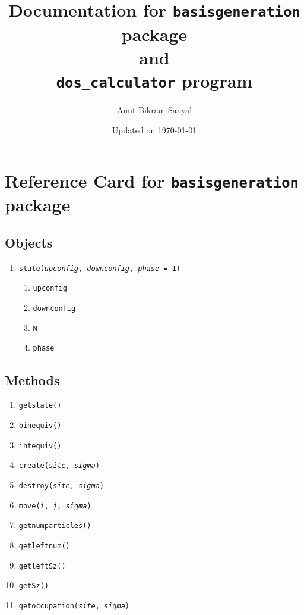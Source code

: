 \documentclass[]{book}
\title{Documentation for \texttt{basisgeneration} package\\and\\\texttt{dos\_calculator} program}
\author{Amit Bikram Sanyal}
\date{Updated on \today}
\begin{document}
\maketitle

\frontmatter

\section*{Reference Card for \texttt{basisgeneration} package}

\subsection*{Objects}

\begin{enumerate}
\item \texttt{state(\textit{upconfig}, \textit{downconfig}, \textit{phase} = 1)}
\begin{enumerate}
	\item \texttt{upconfig}
	\item \texttt{downconfig}
	\item \texttt{N}
	\item \texttt{phase}
\end{enumerate}
\end{enumerate}

\subsection*{Methods}

\begin{enumerate}
\item \texttt{getstate()}
\item \texttt{binequiv()}
\item \texttt{intequiv()}
\item \texttt{create(\textit{site}, \textit{sigma})}
\item \texttt{destroy(\textit{site}, \textit{sigma})}
\item \texttt{move(\textit{i}, \textit{j}, \textit{sigma})}
\item \texttt{getnumparticles()}
\item \texttt{getleftnum()}
\item \texttt{getleftSz()}
\item \texttt{getSz()}
\item \texttt{getoccupation(\textit{site}, \textit{sigma})}
\end{enumerate}
\end{document}
